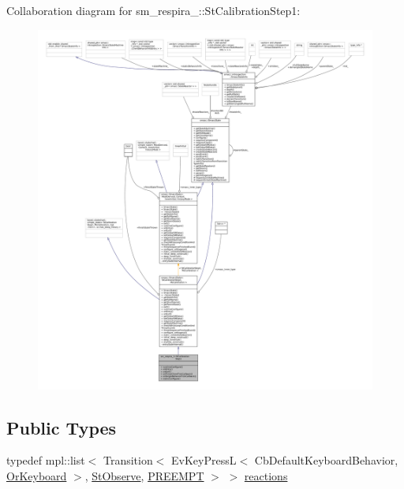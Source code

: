 Collaboration diagram for sm\+\_\+respira\+\_\+:\+:St\+Calibration\+Step1\+:
\nopagebreak
\begin{figure}[H]
\begin{center}
\leavevmode
\includegraphics[width=350pt]{structsm__respira__1_1_1StCalibrationStep1__coll__graph}
\end{center}
\end{figure}
\subsection*{Public Types}
\begin{DoxyCompactItemize}
\item 
typedef mpl\+::list$<$ Transition$<$ Ev\+Key\+PressL$<$ Cb\+Default\+Keyboard\+Behavior, \hyperlink{classsm__respira__1_1_1OrKeyboard}{Or\+Keyboard} $>$, \hyperlink{structsm__respira__1_1_1StObserve}{St\+Observe}, \hyperlink{classPREEMPT}{P\+R\+E\+E\+M\+PT} $>$ $>$ \hyperlink{structsm__respira__1_1_1StCalibrationStep1_a67c9271069e31b4c917e0f6c24256d34}{reactions}
\end{DoxyCompactItemize}
